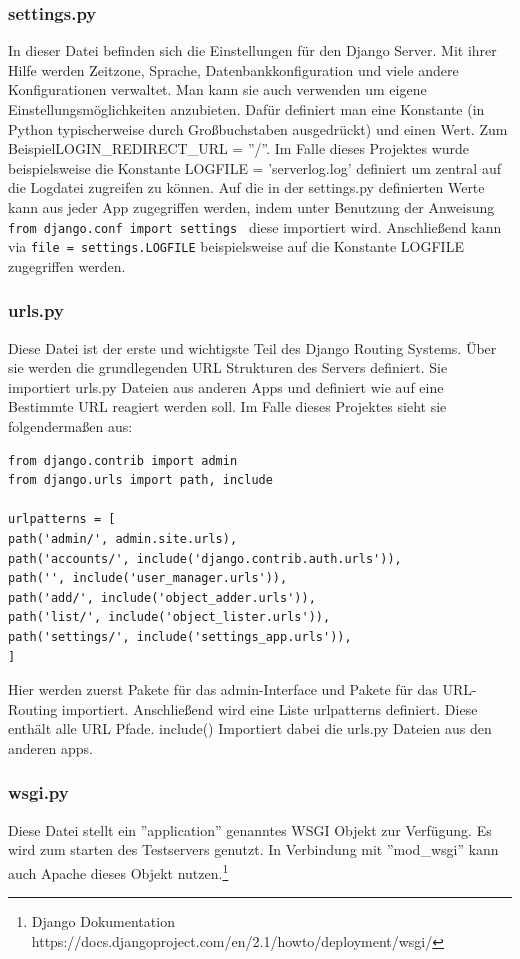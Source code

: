 \documentclass{article}
\begin{document}
\subsubsection{settings.py}
In dieser Datei befinden sich die Einstellungen für den Django Server. Mit ihrer Hilfe werden Zeitzone, Sprache, Datenbankkonfiguration und viele andere Konfigurationen verwaltet. Man kann sie auch verwenden um eigene Einstellungsmöglichkeiten anzubieten. Dafür definiert man eine Konstante (in Python typischerweise durch Großbuchstaben ausgedrückt) und einen Wert. Zum Beispiel\newline LOGIN\_REDIRECT\_URL = ''/''. Im Falle dieses Projektes wurde beispielsweise die Konstante LOGFILE = 'serverlog.log' definiert um zentral auf die Logdatei zugreifen zu können. Auf die in der settings.py definierten Werte kann aus jeder App zugegriffen werden, indem unter Benutzung der Anweisung\newline
 \texttt{from django.conf import settings }  diese importiert wird. Anschließend kann via \texttt{file = settings.LOGFILE} beispielsweise auf die Konstante LOGFILE zugegriffen werden.
 
\subsubsection{urls.py}
Diese Datei ist der erste und wichtigste Teil des Django Routing Systems. Über sie werden die grundlegenden URL Strukturen des Servers definiert. Sie importiert urls.py Dateien aus anderen Apps und definiert wie auf eine Bestimmte URL reagiert werden soll. Im Falle dieses Projektes sieht sie folgendermaßen aus:

\begin{verbatim}
from django.contrib import admin
from django.urls import path, include
	
urlpatterns = [
path('admin/', admin.site.urls),
path('accounts/', include('django.contrib.auth.urls')),
path('', include('user_manager.urls')),
path('add/', include('object_adder.urls')),
path('list/', include('object_lister.urls')),
path('settings/', include('settings_app.urls')),
]
\end{verbatim}
Hier werden zuerst Pakete für das admin-Interface und Pakete für das URL-Routing importiert. Anschließend wird eine Liste urlpatterns definiert. Diese enthält alle URL Pfade. include() Importiert dabei die urls.py Dateien aus den anderen apps.

\subsubsection{wsgi.py}
Diese Datei stellt ein ''application'' genanntes WSGI Objekt zur Verfügung. Es wird zum starten des Testservers genutzt. In Verbindung mit ''mod\_wsgi'' kann auch Apache dieses Objekt nutzen.\footnote{Django Dokumentation https://docs.djangoproject.com/en/2.1/howto/deployment/wsgi/}
\end{document}
